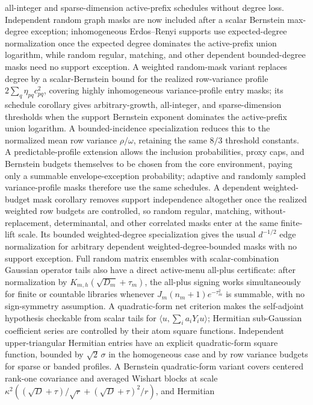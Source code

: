 \documentclass[11pt]{article}
\begin{document}
all-integer and sparse-dimension active-prefix schedules without degree loss.
Independent random graph masks are now included after a scalar Bernstein
max-degree exception; inhomogeneous Erdos--Renyi supports use expected-degree
normalization once the expected degree dominates the active-prefix union
logarithm, while random regular, matching, and other dependent bounded-degree
masks need no support exception.  A weighted random-mask variant replaces degree
by a scalar-Bernstein bound for the realized row-variance profile
\(2\sum_q\eta_{pq}c_{pq}^2\), covering highly inhomogeneous variance-profile
entry masks; its schedule corollary gives arbitrary-growth, all-integer, and
sparse-dimension thresholds when the support Bernstein exponent dominates the
active-prefix union logarithm.  A bounded-incidence specialization reduces this
to the normalized mean row variance \(\rho/\omega\), retaining the same \(8/3\)
threshold constants.  A predictable-profile extension allows the
inclusion probabilities, proxy caps, and Bernstein budgets themselves to be
chosen from the core environment, paying only a summable envelope-exception
probability; adaptive and randomly sampled variance-profile masks therefore use
the same schedules.  A dependent weighted-budget mask corollary removes support
independence altogether once the realized weighted row budgets are controlled,
so random regular, matching, without-replacement, determinantal, and other
correlated masks enter at the same finite-lift scale.  Its bounded
weighted-degree specialization gives the usual \(d^{-1/2}\) edge normalization
for arbitrary dependent weighted-degree-bounded masks with no support
exception.
Full random matrix ensembles with scalar-combination Gaussian operator tails
also have a direct active-menu all-plus certificate: after normalization by
\(K_{m,h}(\sqrt{D_m}+\tau_m)\), the all-plus signing works simultaneously for
finite or countable libraries whenever \(J_m(n_m+1)e^{-\tau_m^2}\) is
summable, with no sign-symmetry assumption.  A quadratic-form net criterion
makes the self-adjoint hypothesis checkable from scalar tails for
\(\langle u,\sum_i a_iY_i u\rangle\); Hermitian sub-Gaussian coefficient
series are controlled by their atom square functions.  Independent
upper-triangular Hermitian entries have an explicit quadratic-form square
function, bounded by \(\sqrt2\,\sigma\) in the homogeneous case and by row
variance budgets for sparse or banded profiles.  A Bernstein quadratic-form
variant covers centered rank-one covariance and averaged Wishart blocks at scale
\(\kappa^2((\sqrt D+\tau)/\sqrt r+(\sqrt D+\tau)^2/r)\), and Hermitian
\end{document}
